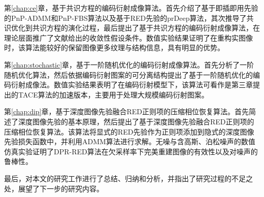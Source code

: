 第\ref{chap:ce}章，基于共识方程的编码衍射成像算法。首先介绍了基于即插即用先验的PnP-ADMM和PnP-FBS算法以及基于RED先验的prDeep算法，其次推导了共识优化到共识方程的演化过程，最后提出了基于共识方程的编码衍射成像算法，在理论层面推广了文献\cite{Xiran}给出的收敛性假设条件。数值实验结果证明了在重构实图像时，该算法能较好的保留图像更多纹理与结构信息，具有明显的优势。

第\ref{chap:stochastic}章，基于一阶随机优化的编码衍射成像算法。首先分析了一阶随机优化算法，然后依据编码衍射图案的可分离结构提出了基于一阶随机优化的编码衍射成像法。数值实验结果表明了在编码衍射模型下，该算法可看作是第三章提出的TACE算法的加速版本，主要用于处理大规模编码衍射图案。

第\ref{chap:dip}章，基于深度图像先验融合RED正则项的压缩相位恢复算法。首先简述了深度图像先验的基本原理，然后提出了基于深度图像先验融合RED正则项的压缩相位恢复算法。该算法将显式的RED先验作为正则项添加到隐式的深度图像先验损失函数中，并利用ADMM算法进行求解。无噪与含高斯、泊松噪声的数值仿真实验证明了DPR-RED算法在欠采样率下完美重建图像的有效性以及对噪声的鲁棒性。



最后，对本文的研究工作进行了总结、归纳和分析，并指出了研究过程的不足之处，展望了下一步的研究内容。 